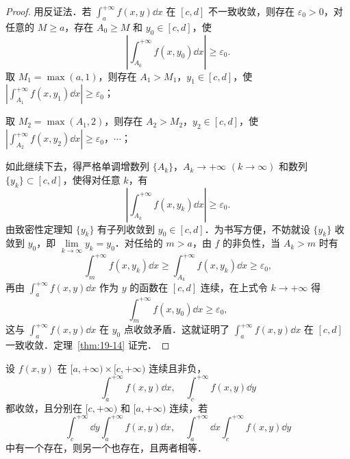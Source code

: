\begin{proof}
用反证法．若 $\displaystyle\int_{a}^{+\infty}f(x,y)\dd x$ 在 $[c,d]$ 不一致收敛，则存在 $\varepsilon_{0}>0$，对任意的 $M\geqslant a$，存在 $A_{0}\geqslant M$ 和 $y_{0}\in[c,d]$，使
\[
\left|\int_{A_{0}}^{+\infty}f(x,y_{0})\dd x\right|\geqslant\varepsilon_{0}.
\]
取 $M_{1}=\max(a,1)$，则存在 $A_{1}>M_{1}$，$y_{1}\in[c,d]$，使 $\left|\displaystyle\int_{A_{1}}^{+\infty}f(x,y_{1})\dd x\right|\geqslant\varepsilon_{0}$；

取 $M_{2}=\max(A_{1},2)$，则存在 $A_{2}>M_{2}$，$y_{2}\in[c,d]$，使 $\left|\displaystyle\int_{A_{2}}^{+\infty}f(x,y_{2})\dd x\right|\geqslant\varepsilon_{0}$，$\cdots$；

如此继续下去，得严格单调增数列 $\{A_{k}\}$，$A_{k}\to+\infty$ $(k\to\infty)$ 和数列 $\{y_{k}\}\subset[c,d]$，使得对任意 $k$，有
\[
\left|\int_{A_{k}}^{+\infty}f(x,y_{k})\dd x\right|\geqslant\varepsilon_{0}.
\]
由致密性定理知 $\{y_{k}\}$ 有子列收敛到 $y_{0}\in[c,d]$．为书写方便，不妨就设 $\{y_{k}\}$ 收敛到 $y_{0}$，即 $\lim\limits_{k\to\infty}y_{k}=y_{0}$．对任给的 $m>a$，由 $f$ 的非负性，当 $A_{k}>m$ 时有
\[
\int_{m}^{+\infty}f(x,y_{k})\dd x\geqslant\int_{A_{k}}^{+\infty}f(x,y_{k})\dd x\geqslant\varepsilon_{0},
\]
再由 $\displaystyle\int_{a}^{+\infty}f(x,y)\dd x$ 作为 $y$ 的函数在 $[c,d]$ 连续，在上式令 $k\to+\infty$ 得
\[
\int_{m}^{+\infty}f(x,y_{0})\dd x\geqslant\varepsilon_{0},
\]
这与 $\displaystyle\int_{a}^{+\infty}f(x,y)\dd x$ 在 $y_{0}$ 点收敛矛盾．这就证明了 $\displaystyle\int_{a}^{+\infty}f(x,y)\dd x$ 在 $[c,d]$ 一致收敛．定理~\ref{thm:19-14} 证完．
\end{proof}

\begin{theorem}\label{thm:19-15}
设 $f(x,y)$ 在 $[a,+\infty)\times[c,+\infty)$ 连续且非负，
\[
\int_{a}^{+\infty}f(x,y)\dd x,\quad\int_{c}^{+\infty}f(x,y)\dd y
\]
都收敛，且分别在 $[c,+\infty)$ 和 $[a,+\infty)$ 连续，若
\[
\int_{c}^{+\infty}\dd y\int_{a}^{+\infty}f(x,y)\dd x,\quad\int_{a}^{+\infty}\dd x\int_{c}^{+\infty}f(x,y)\dd y
\]
中有一个存在，则另一个也存在，且两者相等．
\end{theorem}

